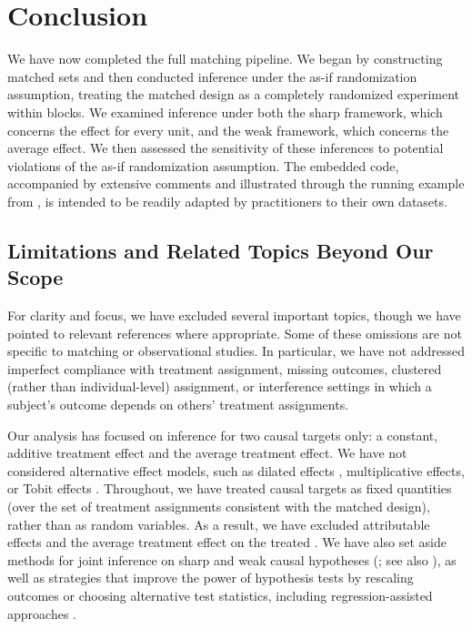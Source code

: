 \documentclass[twoside,11pt]{article}
\begin{document}
\section{Conclusion}\label{conclusion}

We have now completed the full matching pipeline. We began by
constructing matched sets and then conducted inference under the as-if
randomization assumption, treating the matched design as a completely randomized
experiment within blocks. We examined inference
under both the sharp framework, which concerns the effect for every
unit, and the weak framework, which concerns the average effect. We
then assessed the sensitivity of these inferences to potential
violations of the as-if randomization assumption. The embedded code,
accompanied by extensive comments and illustrated through the running
example from \citet{gilligansergenti2008}, is intended to be readily
adapted by practitioners to their own datasets.

\subsection{Limitations and Related Topics Beyond Our
Scope}\label{limitations-and-related-topics-beyond-our-scope}

For clarity and focus, we have excluded several important topics, though
we have pointed to relevant references where appropriate. Some of these
omissions are not specific to matching or observational studies. In
particular, we have not addressed imperfect compliance with treatment
assignment, missing outcomes, clustered (rather than individual-level)
assignment, or interference settings in which a subject's outcome
depends on others' treatment assignments.

Our analysis has focused on inference for two causal targets only: a
constant, additive treatment effect and the average treatment effect. We
have not considered alternative effect models, such as dilated effects
\citep{rosenbaum1999}, multiplicative effects, or Tobit effects
\citep[pp.~46--48]{rosenbaum2010}. Throughout, we have treated causal
targets as fixed quantities (over the set of treatment assignments
consistent with the matched design), rather than as random variables. As
a result, we have excluded attributable effects
\citep{rosenbaum2001, rosenbaum2003, hansenbowers2009} and the average
treatment effect on the treated \citep{sekhonshem-tov2021}. We have also
set aside methods for joint inference on sharp and weak causal
hypotheses (\citealp{wuding2021, cohenfogarty2022}; see also \citealp{ding2017}),
as well as
strategies that improve the power of hypothesis tests by rescaling
outcomes or choosing alternative test statistics, including
regression-assisted approaches
\citep{lin2013, cohenfogarty2023, guobasse2023}.
\end{document}
